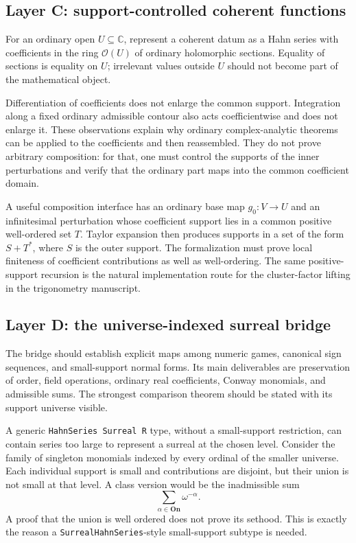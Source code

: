 \documentclass[11pt,letterpaper]{article}
\numberwithin{equation}{section}
\theoremstyle{definition}
\theoremstyle{remark}
\newcommand{\On}{\mathbf{On}}
\newcommand{\C}{\mathbb{C}}
\newcommand{\OO}{\mathcal{O}}
\begin{document}
\subsection{Layer C: support-controlled coherent functions}
For an ordinary open $U\subseteq\C$, represent a coherent datum as a Hahn series with coefficients in the ring $\OO(U)$ of ordinary holomorphic sections. Equality of sections is equality on $U$; irrelevant values outside $U$ should not become part of the mathematical object.

Differentiation of coefficients does not enlarge the common support. Integration along a fixed ordinary admissible contour also acts coefficientwise and does not enlarge it. These observations explain why ordinary complex-analytic theorems can be applied to the coefficients and then reassembled. They do not prove arbitrary composition: for that, one must control the supports of the inner perturbations and verify that the ordinary part maps into the common coefficient domain.

A useful composition interface has an ordinary base map $g_0:V\to U$ and an infinitesimal perturbation whose coefficient support lies in a common positive well-ordered set $T$. Taylor expansion then produces supports in a set of the form $S+T^*$, where $S$ is the outer support. The formalization must prove local finiteness of coefficient contributions as well as well-ordering. The same positive-support recursion is the natural implementation route for the cluster-factor lifting in the trigonometry manuscript.

\subsection{Layer D: the universe-indexed surreal bridge}
The bridge should establish explicit maps among numeric games, canonical sign sequences, and small-support normal forms. Its main deliverables are preservation of order, field operations, ordinary real coefficients, Conway monomials, and admissible sums. The strongest comparison theorem should be stated with its support universe visible.

A generic \texttt{HahnSeries Surreal R} type, without a small-support restriction, can contain series too large to represent a surreal at the chosen level. Consider the family of singleton monomials indexed by every ordinal of the smaller universe. Each individual support is small and contributions are disjoint, but their union is not small at that level. A class version would be the inadmissible sum
\[
 \sum_{\alpha\in\On}\omega^{-\alpha}.
\]
A proof that the union is well ordered does not prove its sethood. This is exactly the reason a \texttt{SurrealHahnSeries}-style small-support subtype is needed.
\end{document}
